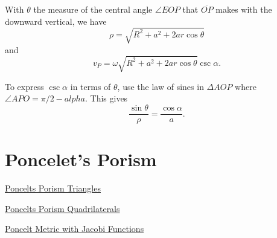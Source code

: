 \documentclass{ximera}
\begin{document}
With $\theta$ the measure of the central angle $\angle EOP$ that $\overline{OP}$ makes with the downward vertical, we have
\[
  \rho = \sqrt{R^2 + a^2 + 2ar \cos \theta}
\]
and 
\[
    v_P = \omega \sqrt{R^2 + a^2 + 2ar \cos \theta} \csc \alpha .
\]

To express $\csc\alpha$ in terms of $\theta$, use the law of sines in $\Delta AOP$ where $\angle APO = \pi/2 - alpha$. This gives
\[
    \frac{\sin\theta}{\rho} = \frac{\cos\alpha}{a}.
\]



\section*{Poncelet's Porism}


\begin{exploration}

\begin{onlineOnly}
    \begin{center}
\end{center}
\end{onlineOnly}

\href{https://www.desmos.com/calculator/0aihemcv0o}{Poncelts Porism Triangles}

\end{exploration}


\begin{exploration}

\begin{onlineOnly}
    \begin{center}
\end{center}
\end{onlineOnly}

\href{https://www.desmos.com/calculator/pua4ogjcmr}{Poncelts Porism Quadrilaterals}


\end{exploration}



\begin{onlineOnly}
    \begin{center}
\end{center}
\end{onlineOnly}

\href{https://www.desmos.com/calculator/q16ify3gtm}{Poncelt Metric with Jacobi Functions}



\begin{onlineOnly}
    \begin{center}
\end{center}
\end{onlineOnly}
\end{document}
